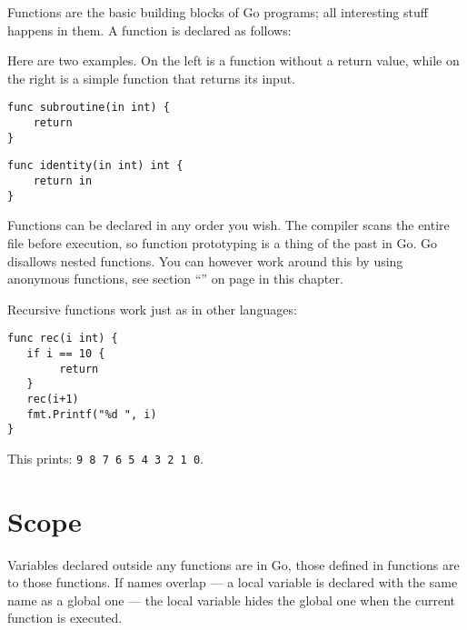 
\noindent{}Functions are the basic building blocks of Go programs; all interesting
stuff happens in them. A function is declared as follows:

\showremarks
Here are two examples. On the left is a function without a return value,
while on the right is a simple function that returns its input.

\begin{minipage}{.5\textwidth}
\begin{lstlisting}
func subroutine(in int) {
    return
}
\end{lstlisting}
\end{minipage}
\begin{minipage}{.5\textwidth}
\begin{lstlisting}
func identity(in int) int {
    return in
}
\end{lstlisting}
\end{minipage}

Functions can be declared in any order you wish. The compiler scans the
entire file before execution, so function prototyping is a thing of the
past in Go.
Go disallows nested functions.  You can however
work around this by using anonymous functions, see section
``'' on page \pageref{sec:functions as values} 
in this chapter.

Recursive functions work just as in other languages:
\begin{lstlisting}[caption=Recursive function]
func rec(i int) {
   if i == 10 {
        return
   }
   rec(i+1)
   fmt.Printf("%d ", i)
}
\end{lstlisting}
This prints: \texttt{9 8 7 6 5 4 3 2 1 0}.
\section{Scope}
Variables declared outside any functions are  in Go, those
defined in functions are  to those functions. If names overlap --- a
local variable is declared with the same name as a global one --- the
local variable hides the global one when the current function is
executed.

